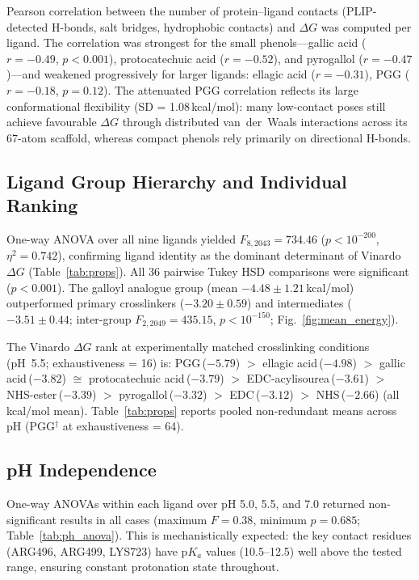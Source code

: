\documentclass[11pt]{article}
\begin{document}
Pearson correlation between the number of protein--ligand contacts
(PLIP-detected H-bonds, salt bridges, hydrophobic contacts) and
$\Delta G$ was computed per ligand.  The correlation was strongest for
the small phenols---gallic acid ($r = -0.49$, $p < 0.001$),
protocatechuic acid ($r = -0.52$), and pyrogallol ($r = -0.47$)---and
weakened progressively for larger ligands: ellagic acid ($r = -0.31$),
PGG ($r = -0.18$, $p = 0.12$).  The attenuated PGG correlation reflects
its large conformational flexibility (SD = 1.08\,kcal/mol): many
low-contact poses still achieve favourable $\Delta G$ through distributed
van~der~Waals interactions across its 67-atom scaffold, whereas compact
phenols rely primarily on directional H-bonds.

\subsection{Ligand Group Hierarchy and Individual Ranking}
\label{sec:ligand_rank}

One-way ANOVA over all nine ligands yielded $F_{8,2043} = 734.46$
($p < 10^{-200}$, $\eta^{2} = 0.742$), confirming ligand identity as the
dominant determinant of Vinardo $\Delta G$ (Table~\ref{tab:props}).
All 36 pairwise Tukey HSD comparisons were significant ($p < 0.001$).
The galloyl analogue group (mean $-4.48 \pm 1.21$\,kcal/mol) outperformed
primary crosslinkers ($-3.20 \pm 0.59$) and intermediates
($-3.51 \pm 0.44$; inter-group $F_{2,2049} = 435.15$, $p < 10^{-150}$;
Fig.~\ref{fig:mean_energy}).

The Vinardo $\Delta G$ rank at experimentally matched crosslinking conditions
(pH~5.5; exhaustiveness = 16) is:
PGG\,($-5.79$) $>$ ellagic acid\,($-4.98$) $>$ gallic
acid\,($-3.82$) $\cong$ protocatechuic acid\,($-3.79$) $>$
EDC-acylisourea\,($-3.61$) $>$ NHS-ester\,($-3.39$) $>$
pyrogallol\,($-3.32$) $>$ EDC\,($-3.12$) $>$ NHS\,($-2.66$)
(all kcal/mol mean).
Table~\ref{tab:props} reports pooled non-redundant means across pH
(PGG$^{\dagger}$ at exhaustiveness = 64).

\subsection{pH Independence}
\label{sec:ph}

One-way ANOVAs within each ligand over pH 5.0, 5.5, and 7.0 returned
non-significant results in all cases (maximum $F = 0.38$, minimum $p = 0.685$;
Table~\ref{tab:ph_anova}).
This is mechanistically expected: the key contact residues (ARG496,
ARG499, LYS723) have p$K_{a}$ values (10.5--12.5) well above the tested
range, ensuring constant protonation state throughout.
\end{document}
